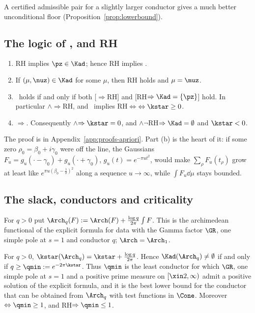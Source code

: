 A certified admissible pair for a slightly larger conductor gives a much better unconditional floor
(Proposition~\ref{prop:lowerbound}).

\subsection{The logic of \texorpdfstring{\condE, \condU}{(E), (U)} and RH}

\begin{theorem}[Logic]\label{thm:logic}
\begin{enumerate}[label=\textup{(\alph*)}]
\item RH implies $\pz\in\Kad$; hence RH implies \condE.
\item If $(\mu,\nuz)\in\Kad$ for some $\mu$, then RH holds and $\mu=\muz$.
\item \condU\ holds if and only if both \textup{[}\condE$\Rightarrow$RH\textup{]} and \textup{[}RH$\Rightarrow\Kad=\{\pz\}$\textup{]}
hold. In particular \condE$\wedge$\condU$\Rightarrow$RH, and \condU\ implies RH$\Leftrightarrow$\condE$\Leftrightarrow\kstar\ge0$.
\item \condU$\Rightarrow$\condS. Consequently \condU$\wedge$\condE$\Rightarrow\kstar=0$, and \condU$\wedge\neg$RH$\Rightarrow\Kad=\emptyset$
and $\kstar<0$.
\end{enumerate}
\end{theorem}

The proof is in Appendix~\ref{app:proofs-apriori}. Part (b) is the heart of it: if some zero $\rho_0=\beta_0+i\gamma_0$ were off the line,
the Gaussians $F_u=g_u(\cdot-\gamma_0)+g_u(\cdot+\gamma_0)$, $g_u(t)=e^{-\pi ut^2}$, would make $\sum_\rho F_u(t_\rho)$ grow at least like
$e^{\pi u(\beta_0-\frac12)^2}$ along a sequence $u\to\infty$, while $\int F_u\dd\mu$ stays bounded.

\subsection{The slack, conductors and criticality}\label{ssec:criticality}

For $q>0$ put $\Arch_q(F):=\Arch(F)+\frac{\log q}{2\pi}\int F$. This is the archimedean functional of the explicit
formula for data with the Gamma factor $\GR$, one simple pole at $s=1$ and conductor $q$; $\Arch=\Arch_1$.

\begin{proposition}\label{prop:conductor}
For $q>0$, $\kstar(\Arch_q)=\kstar+\frac{\log q}{2\pi}$. Hence $\Kad(\Arch_q)\ne\emptyset$ if and only if
$q\ge\qmin:=e^{-2\pi\kstar}$. Thus $\qmin$ is the least conductor for which $\GR$, one simple pole at $s=1$ and a positive
prime measure on $[\xin2,\infty)$ admit a positive solution of the explicit formula, and it is the best lower bound for
the conductor that can be obtained from $\Arch_q$ with test functions in $\Cone$. Moreover \condS$\Leftrightarrow\qmin\ge1$, and
RH$\Rightarrow\qmin\le1$.
\end{proposition}

